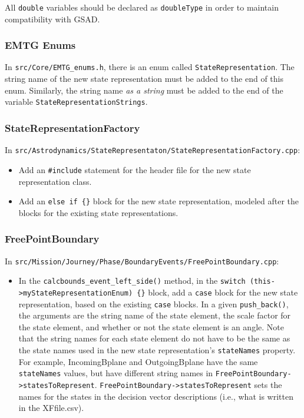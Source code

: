 \documentclass[11pt]{article}
\begin{document}
\noindent All \texttt{double} variables should be declared as \texttt{doubleType} in order to maintain compatibility with \ac{GSAD}.

\subsubsection{EMTG Enums}
\label{subsubsec:emtgEnums}

In \texttt{src/Core/EMTG\_enums.h}, there is an enum called \texttt{StateRepresentation}. The string name of the new state representation must be added to the end of this enum. Similarly, the string name \emph{as a string} must be added to the end of the variable \texttt{StateRepresentationStrings}.

\subsubsection{StateRepresentationFactory}
\label{subsubsec:stateRepresentationFactory}

In \texttt{src/Astrodynamics/StateRepresentaton/StateRepresentationFactory.cpp}:

\begin{itemize}
	\item Add an \texttt{\#include} statement for the header file for the new state representation class.
	\item Add an \texttt{else if \{\}} block for the new state representation, modeled after the blocks for the existing state representations.
\end{itemize} 

\subsubsection{FreePointBoundary}
\label{subsubsec:freePointBoundary}

In \texttt{src/Mission/Journey/Phase/BoundaryEvents/FreePointBoundary.cpp}:

\begin{itemize}
	\item In the \texttt{calcbounds\_event\_left\_side()} method, in the \texttt{switch (this->myStateRepresentationEnum) \{\}} block, add a \texttt{case} block for the new state representation, based on the existing \texttt{case} blocks. In a given \texttt{push\_back()}, the arguments are the string name of the state element, the scale factor for the state element, and whether or not the state element is an angle. Note that the string names for each state element do not have to be the same as the state names used in the new state representation's \texttt{stateNames} property. For example, IncomingBplane and OutgoingBplane have the same \texttt{stateNames} values, but have different string names in \texttt{FreePointBoundary->statesToRepresent}. \texttt{FreePointBoundary->statesToRepresent} sets the names for the states in the decision vector descriptions (i.e., what is written in the XFfile.csv).
\end{itemize}
\end{document}
